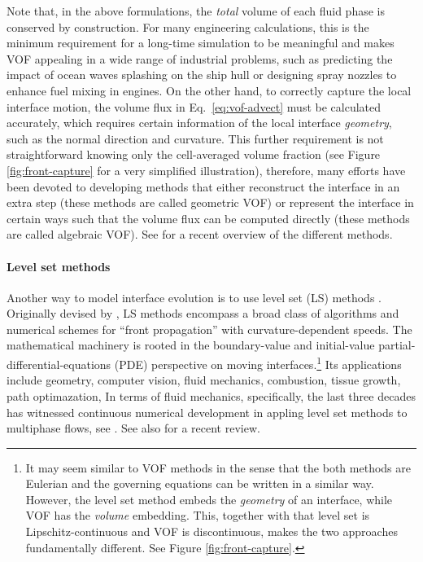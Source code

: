 Note that, in the above formulations, the \emph{total} volume of each fluid phase is conserved by construction.
For many engineering calculations, this is the minimum requirement for a long-time simulation to be meaningful and makes VOF appealing in a wide range of industrial problems, such as predicting the impact of ocean waves splashing on the ship hull or designing spray nozzles to enhance fuel mixing in engines.
On the other hand, to correctly capture the local interface motion, the volume flux in Eq.\ \eqref{eq:vof-advect} must be calculated accurately, which requires certain information of the local interface \emph{geometry}, such as the normal direction and curvature.
This further requirement is not straightforward knowing only the cell-averaged volume fraction (see Figure \ref{fig:front-capture} for a very simplified illustration), therefore, many efforts have been devoted to developing methods that either reconstruct the interface in an extra step (these methods are called geometric VOF) or represent the interface in certain ways such that the volume flux can be computed directly (these methods are called algebraic VOF). See \cite{mirjalili_jain_dodd_2017a} for a recent overview of the different methods.


\medskip
\paragraph{\bf Level set methods}

Another way to model interface evolution is to use level set (LS) methods \citep{sethian_1999a}.
Originally devised by \cite{Osher_Sethian_levelset}, LS methods encompass a broad class of algorithms and numerical schemes for ``front propagation'' with curvature-dependent speeds.
The mathematical machinery is rooted in the boundary-value and initial-value partial-differential-equations (PDE) perspective on moving interfaces.\footnote{It may seem similar to VOF methods in the sense that the both methods are Eulerian and the governing equations can be written in a similar way. However, the level set method embeds the \emph{geometry} of an interface, while VOF has the \emph{volume} embedding. This, together with that level set is Lipschitz-continuous and VOF is discontinuous, makes the two approaches fundamentally different. See Figure \ref{fig:front-capture}.}
Its applications include geometry, computer vision, fluid mechanics, combustion, tissue growth, path optimazation, \etc
In terms of fluid mechanics, specifically, the last three decades has witnessed continuous numerical development in appling level set methods to multiphase flows, see \eg \cite{Mulder_JCP_1992, Sussman_JCP_1994, Sussman_JCP_2000, Enright_JCP_2002, Olsson_JCP_2005, Marchandise_JCP_2007, Desjardins_JCP_2008, Desjardins_JCP_2009, Aanjaneya_JCP_2013, Luo_JCP_2015, ICLS}. See also \cite{Gibou_Fedkiv_Osher} for a recent review.


